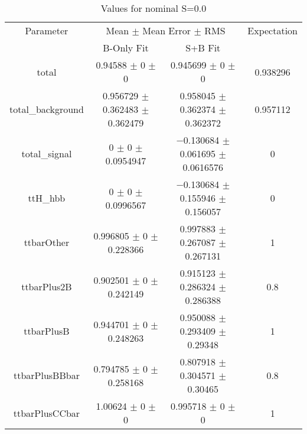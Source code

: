 \begin{table}
\centering
\caption{Values for nominal S=0.0}
\begin{tabular}{cccc}
\toprule
Parameter & \multicolumn{2}{c}{Mean $\pm$ Mean Error $\pm$ RMS} & Expectation\\
 & B-Only Fit & S+B Fit & \\
\midrule
total & \num{0.94588} $\pm$ \num{0} $\pm$ \num{0} & \num{0.945699} $\pm$ \num{0} $\pm$ \num{0} & \num{0.938296}\\
total\_background & \num{0.956729} $\pm$ \num{0.362483} $\pm$ \num{0.362479} & \num{0.958045} $\pm$ \num{0.362374} $\pm$ \num{0.362372} & \num{0.957112}\\
total\_signal & \num{0} $\pm$ \num{0} $\pm$ \num{0.0954947} & \num{-0.130684} $\pm$ \num{0.061695} $\pm$ \num{0.0616576} & \num{0}\\
ttH\_hbb & \num{0} $\pm$ \num{0} $\pm$ \num{0.0996567} & \num{-0.130684} $\pm$ \num{0.155946} $\pm$ \num{0.156057} & \num{0}\\
ttbarOther & \num{0.996805} $\pm$ \num{0} $\pm$ \num{0.228366} & \num{0.997883} $\pm$ \num{0.267087} $\pm$ \num{0.267131} & \num{1}\\
ttbarPlus2B & \num{0.902501} $\pm$ \num{0} $\pm$ \num{0.242149} & \num{0.915123} $\pm$ \num{0.286324} $\pm$ \num{0.286388} & \num{0.8}\\
ttbarPlusB & \num{0.944701} $\pm$ \num{0} $\pm$ \num{0.248263} & \num{0.950088} $\pm$ \num{0.293409} $\pm$ \num{0.29348} & \num{1}\\
ttbarPlusBBbar & \num{0.794785} $\pm$ \num{0} $\pm$ \num{0.258168} & \num{0.807918} $\pm$ \num{0.304571} $\pm$ \num{0.30465} & \num{0.8}\\
ttbarPlusCCbar & \num{1.00624} $\pm$ \num{0} $\pm$ \num{0} & \num{0.995718} $\pm$ \num{0} $\pm$ \num{0} & \num{1}\\
\bottomrule
\end{tabular}
\end{table}